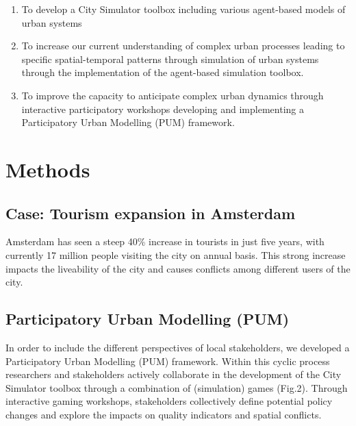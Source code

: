 \documentclass[]{book}
\providecommand{\tightlist}{%
  \setlength{\itemsep}{0pt}\setlength{\parskip}{0pt}}
\theoremstyle{definition}
\theoremstyle{definition}
\theoremstyle{definition}
\theoremstyle{remark}
\begin{document}
\begin{enumerate}
\def\labelenumi{\arabic{enumi})}
\tightlist
\item
  To develop a City Simulator toolbox including various agent-based
  models of urban systems
\item
  To increase our current understanding of complex urban processes
  leading to specific spatial-temporal patterns through simulation of
  urban systems through the implementation of the agent-based simulation
  toolbox.
\item
  To improve the capacity to anticipate complex urban dynamics through
  interactive participatory workshops developing and implementing a
  Participatory Urban Modelling (PUM) framework.
\end{enumerate}

\hypertarget{methods}{%
\section{Methods}\label{methods}}

\hypertarget{case-tourism-expansion-in-amsterdam}{%
\subsection{Case: Tourism expansion in
Amsterdam}\label{case-tourism-expansion-in-amsterdam}}

Amsterdam has seen a steep 40\% increase in tourists in just five years,
with currently 17 million people visiting the city on annual basis. This
strong increase impacts the liveability of the city and causes conflicts
among different users of the city.

\hypertarget{participatory-urban-modelling-pum}{%
\subsection{Participatory Urban Modelling
(PUM)}\label{participatory-urban-modelling-pum}}

In order to include the different perspectives of local stakeholders, we
developed a Participatory Urban Modelling (PUM) framework. Within this
cyclic process researchers and stakeholders actively collaborate in the
development of the City Simulator toolbox through a combination of
(simulation) games (Fig.2). Through interactive gaming workshops,
stakeholders collectively define potential policy changes and explore
the impacts on quality indicators and spatial conflicts.
\end{document}
